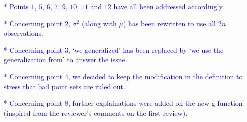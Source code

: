 \documentclass[10pt,a4paper]{article}
\begin{document}
\textcolor{blue}{
\begin{itemize}
\item[*]Points $1$, $5$, $6$, $7$, $9$, $10$, $11$ and $12$ have all been addressed accordingly.
\item[*]Concerning point $2$, $\sigma^2$ (along with $\mu$) has been rewritten to use all $2n$ observations.
\item[*]Concerning point $3$, `we generalized' has been replaced by `we use the generalization from' to answer the issue.
\item[*]Concerning point $4$, we decided to keep the modification in the definition to stress that bad point sets are ruled out.
\item[*]Concerning point $8$, further explainations were added on the new g-function (inspired from the reviewer's comments on the first review).
\end{itemize}}
\end{document}
